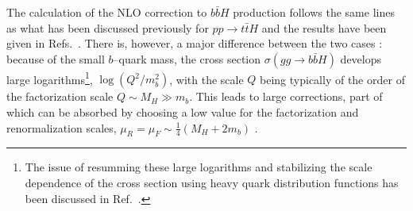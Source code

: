 The calculation of the NLO correction to $b\bar b H$ production follows the same
lines as what has been discussed previously for $pp \to t\bar t H$ and the
results have been given in  Refs.~\cite{Hbb-NLO1,Hbb-NLO2}. There is, however, 
a major difference between the two cases \cite{pp-Hbb-pheno1}: because of the 
small $b$--quark mass, the cross section $\sigma (gg \to b\bar b H)$ develops 
large logarithms\footnote{The issue of resumming these large logarithms and
stabilizing the scale dependence of the cross section using heavy quark
distribution functions has been discussed in Ref.~\cite{pp-Hbb-NLO3}.},
$\log(Q^2/m_b^2)$, with the scale $Q$ being typically of the order of the
factorization scale $Q \sim M_H \gg m_b$. This leads  to large corrections,
part of which can be absorbed by choosing a low value for the factorization and
renormalization scales, $\mu_R = \mu_F \sim \frac{1}{4} (M_H+ 2m_b)$
\cite{pp-Hbb-pheno1,pp-Hbb-NLO3}. \s 

